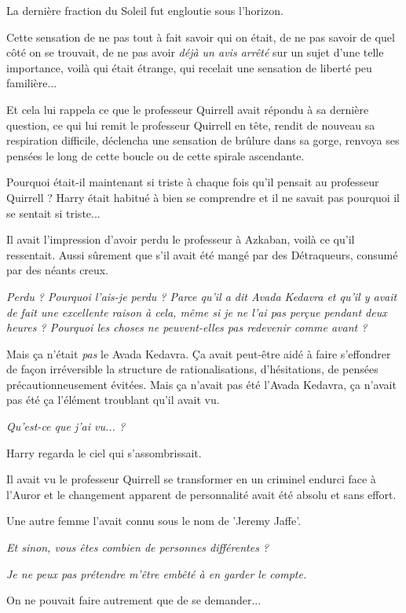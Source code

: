 La dernière fraction du Soleil fut engloutie sous l'horizon.

Cette sensation de ne pas tout à fait savoir qui on était, de ne pas savoir de quel côté on se trouvait, de ne pas avoir \emph{déjà un avis arrêté } sur un sujet d'une telle importance, voilà qui était étrange, qui recelait une sensation de liberté peu familière...

Et cela lui rappela ce que le professeur Quirrell avait répondu à sa dernière question, ce qui lui remit le professeur Quirrell en tête, rendit de nouveau sa respiration difficile, déclencha une sensation de brûlure dans sa gorge, renvoya ses pensées le long de cette boucle ou de cette spirale ascendante.

Pourquoi était-il maintenant si triste à chaque fois qu'il pensait au professeur Quirrell ? Harry était habitué à bien se comprendre et il ne savait pas pourquoi il se sentait si triste...

Il avait l'impression d'avoir perdu le professeur à Azkaban, voilà ce qu'il ressentait. Aussi sûrement que s'il avait été mangé par des Détraqueurs, consumé par des néants creux.

\emph{Perdu ? Pourquoi l'ais-je perdu ? Parce qu'il a dit Avada Kedavra et qu'il y avait de fait une excellente raison à cela, même si je ne l'ai pas perçue pendant deux heures ? Pourquoi les choses ne peuvent-elles pas redevenir comme avant ?} 

Mais ça n'était \emph{pas}  le Avada Kedavra. Ça avait peut-être aidé à faire s'effondrer de façon irréversible la structure de rationalisations, d'hésitations, de pensées précautionneusement évitées. Mais ça n'avait pas été l'Avada Kedavra, ça n'avait pas été ça l'élément troublant qu'il avait vu.

\emph{Qu'est-ce que j'ai vu... ?} 

Harry regarda le ciel qui s'assombrissait.

Il avait vu le professeur Quirrell se transformer en un criminel endurci face à l'Auror et le changement apparent de personnalité avait été absolu et sans effort.

Une autre femme l'avait connu sous le nom de 'Jeremy Jaffe'.

\emph{Et sinon, vous êtes combien de personnes différentes ?} 

\emph{Je ne peux pas prétendre m'être embêté à en garder le compte.} 

On ne pouvait faire autrement que de se demander...

